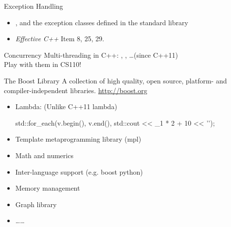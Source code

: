 \begin{frame}{Exception Handling}
    \begin{itemize}
        \item {},  and the exception classes defined in the standard library
        \item \textit{Effective C++} Item 8, 25, 29.
    \end{itemize}
\end{frame}

\begin{frame}{Concurrency}
    Multi-threading in C++: , , \dots (since C++11)\\
    Play with them in CS110!
\end{frame}

\begin{frame}[fragile]{The Boost Library}
    A collection of high quality, open source, platform- and compiler-independent libraries. \url{http://boost.org}
    \begin{itemize}
        \item Lambda: (Unlike C++11 lambda)
        \begin{cpp}
std::for_each(v.begin(), v.end(),
            std::cout << _1 * 2 + 10 << '\n');
        \end{cpp}
        \item Template metaprogramming library (mpl)
        \item Math and numerics
        \item Inter-language support (e.g. boost python)
        \item Memory management
        \item Graph library
        \item \dots\dots
    \end{itemize}
\end{frame}